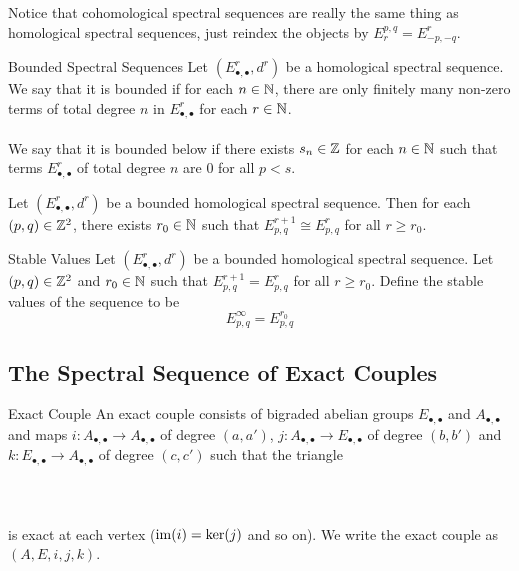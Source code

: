 \documentclass[a4paper]{article}
\begin{document}
Notice that cohomological spectral sequences are really the same thing as homological spectral sequences, just reindex the objects by $E_r^{p,q}=E_{-p,-q}^r$. 

\begin{defn}{Bounded Spectral Sequences}{} Let $(E_{\bullet,\bullet}^r,d^r)$ be a homological spectral sequence. We say that it is bounded if for each $n\in\mathbb{N}$, there are only finitely many non-zero terms of total degree $n$ in $E_{\bullet,\bullet}^r$ for each $r\in\mathbb{N}$. \\~\\

We say that it is bounded below if there exists $s_n\in\mathbb{Z}$ for each $n\in\mathbb{N}$ such that terms $E_{\bullet,\bullet}^r$ of total degree $n$ are $0$ for all $p<s$. 
\end{defn}

\begin{lmm}{}{} Let $(E_{\bullet,\bullet}^r,d^r)$ be a bounded homological spectral sequence. Then for each $(p,q)\in\mathbb{Z}^2$, there exists $r_0\in\mathbb{N}$ such that $E_{p,q}^{r+1}\cong E_{p,q}^r$ for all $r\geq r_0$. 
\end{lmm}

\begin{defn}{Stable Values}{} Let $(E_{\bullet,\bullet}^r,d^r)$ be a bounded homological spectral sequence. Let $(p,q)\in\mathbb{Z}^2$ and $r_0\in\mathbb{N}$ such that $E_{p,q}^{r+1}=E_{p,q}^r$ for all $r\geq r_0$. Define the stable values of the sequence to be $$E_{p,q}^\infty=E_{p,q}^{r_0}$$
\end{defn}

\subsection{The Spectral Sequence of Exact Couples}
\begin{defn}{Exact Couple}{} An exact couple consists of bigraded abelian groups $E_{\bullet,\bullet}$ and $A_{\bullet,\bullet}$ and maps $i:A_{\bullet,\bullet}\to A_{\bullet,\bullet}$ of degree $(a,a')$, $j:A_{\bullet,\bullet}\to E_{\bullet,\bullet}$ of degree $(b,b')$ and $k:E_{\bullet,\bullet}\to A_{\bullet,\bullet}$ of degree $(c,c')$ such that the triangle \\~\\
\\~\\
is exact at each vertex ($\operatorname{im}(i)=\ker(j)$ and so on). We write the exact couple as $(A,E,i,j,k)$. 
\end{defn}
\end{document}

